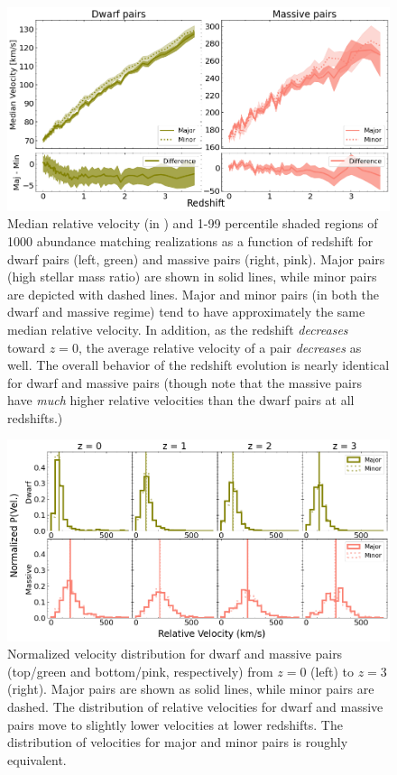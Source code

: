 \documentclass[twocolumn]{aastex631}
\begin{document}
\begin{figure}[htb]
  \centering
  \includegraphics[width=\textwidth]{velocity.png}
  \caption{Median relative velocity (in \kms) and 1-99 percentile shaded regions of 1000 abundance matching realizations as a function of redshift for dwarf pairs (left, green) and massive pairs (right, pink). Major pairs (high stellar mass ratio) are shown in solid lines, while minor pairs are depicted with dashed lines. Major and minor pairs (in both the dwarf and massive regime) tend to have approximately the same median relative velocity. In addition, as the redshift \textit{decreases} toward $z=0$, the average relative velocity of a pair \textit{decreases} as well. The overall behavior of the redshift evolution is nearly identical for dwarf and massive pairs (though note that the massive pairs have \textit{much} higher relative velocities than the dwarf pairs at all redshifts.) 
    }
  \label{fig:vel}
\end{figure}

\begin{figure}[htb]
  \centering
  \includegraphics[width=\textwidth]{velocity_distribution.png}
  \caption{
  Normalized velocity distribution for dwarf and massive pairs (top/green and bottom/pink, respectively) from $z=0$ (left) to $z=3$ (right). Major pairs are shown as solid lines, while minor pairs are dashed. 
  The distribution of relative velocities for dwarf and massive pairs move to slightly lower velocities at lower redshifts. The distribution of velocities for major and minor pairs is roughly equivalent. 
    }
  \label{fig:vel-dist}
\end{figure}
\end{document}
